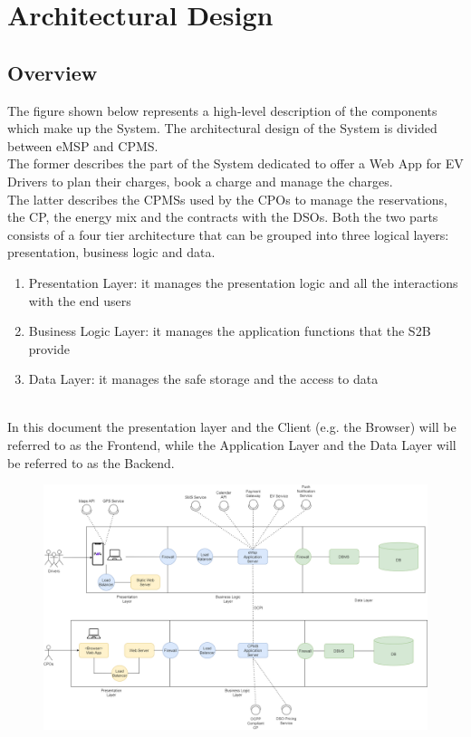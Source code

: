 \section{Architectural Design}
\subsection{Overview}
The figure shown below represents a high-level description of the components which make up the System.
The architectural design of the System is divided between eMSP and CPMS. \\
The former describes the part of the System dedicated to offer a Web App for
EV Drivers to plan their charges, book a charge and manage the charges. \\
The latter describes the CPMSs used by the CPOs to manage the reservations, the CP, the energy mix and the contracts with the DSOs.
Both the two parts consists of a four tier architecture that can be grouped into three logical layers: presentation, business logic and data.
\begin {enumerate}
\item Presentation Layer: it manages the presentation logic and all the interactions with the end users
\item Business Logic Layer: it manages the application functions that the S2B provide
\item Data Layer: it manages the safe storage and the access to data
\end{enumerate}
\hfill \\
In this document the presentation layer and the Client (e.g. the Browser)
will be referred to as the Frontend, while the Application Layer and the Data Layer
will be referred to as the Backend.

\begin{figure}[H]
    \centering
    \includegraphics[scale=0.32]{src/Overview/overview_diagram.png}
\end{figure}

